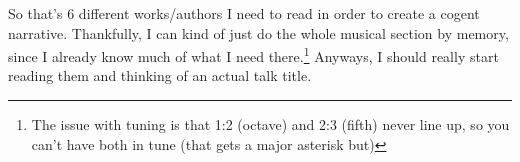 \documentclass[12pt]{article}[titlepage]
\newcommand{\1}{\={a}}
\newcommand{\2}{\={e}}
\newcommand{\3}{\={\i}}
\newcommand{\4}{\=o}
\newcommand{\5}{\=u}
\newcommand{\6}{\={A}}
\renewcommand{\,}{\textsuperscript{,}}
\begin{document}
So that's 6 different works/authors I need to read in order to create a cogent narrative.
Thankfully, I can kind of just do the whole musical section by memory, since I already know much of what I need there.\footnote{The issue with tuning is that 1:2 (octave) and 2:3 (fifth) never line up, so you can't have both in tune (that gets a major asterisk but)}
Anyways, I should really start reading them and thinking of an actual talk title.
\end{document}
